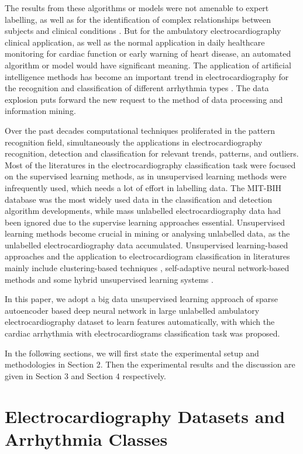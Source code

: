 \documentclass[journal]{IEEEtran}
\begin{document}
The results from these algorithms or models were not amenable to expert labelling, as well as for the identification of complex relationships between subjects and clinical conditions \cite{clifford}.
But for the ambulatory electrocardiography clinical application, as well as the normal application in daily healthcare monitoring for cardiac function or early warning of heart disease, an automated algorithm or model would have significant meaning.
The application of artificial intelligence methods has become an important trend in electrocardiography for the recognition and classification of different arrhythmia types \cite{clifford}. 
The data explosion puts forward the new request to the method of data processing and information mining.


Over the past decades computational techniques proliferated in the pattern recognition field, simultaneously the applications in electrocardiography recognition, detection and classification for relevant trends, patterns, and outliers. 
Most of the literatures in the electrocardiography classification task were focused on the supervised learning methods, as in unsupervised learning methods were infrequently used, which needs a lot of effort in labelling data. The MIT-BIH database \cite{physionet} was the most widely used data in the classification and detection algorithm developments, while mass unlabelled electrocardiography data had been ignored due to the supervise learning approaches essential. 
Unsupervised learning methods become crucial in mining or analysing unlabelled data, as the unlabelled electrocardiography data accumulated. Unsupervised learning-based approaches and the application to electrocardiogram classification in literatures mainly include clustering-based techniques \cite{lager, nishizawa, maier}, self-adaptive neural network-based methods \cite{palreddy, risk} and some hybrid unsupervised learning systems \cite{tadejko}. 

In this paper, we adopt a big data unsupervised learning approach of sparse autoencoder based deep neural network in large unlabelled ambulatory electrocardiography dataset to learn features automatically, with which the cardiac arrhythmia with electrocardiograms classification task was proposed. 

In the following sections, we will first state the experimental setup and methodologies in Section 2. Then the experimental results and the discussion are given in Section 3 and Section 4 respectively.

\section{Electrocardiography Datasets and Arrhythmia Classes}
\end{document}

